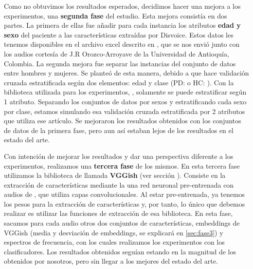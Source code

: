 Como no obtuvimos los resultados esperados, decidimos hacer una mejora a los experimentos, una \textbf{segunda fase} del estudio. Esta mejora consistía en dos partes. La primera de ellas fue añadir para cada instancia los atributos \textbf{edad y sexo} del paciente a las características extraídas por Disvoice. Estos datos les tenemos disponibles en el archivo excel descrito en \cite{OrzCorpus}, que se nos envió junto con los audios cortesía de J.R Orozco-Arroyave de la Universidad de Antioquía, Colombia. La segunda mejora fue separar las instancias del conjunto de datos entre hombres y mujeres. Se planteó de esta manera, debido a que \cite{Orz2016} hace validación cruzada estratificada según dos elementos: edad y clase (PD:  o HC: ). Con la biblioteca utilizada para los experimentos, , solamente se puede estratificar según 1 atributo. Separando los conjuntos de datos por sexos y estratificando cada sexo por clase, estamos simulando esa validación cruzada estratificada por 2 atributos que utiliza ese artículo. Se mejoraron los resultados obtenidos con los conjuntos de datos de la primera fase, pero aun así estaban lejos de los resultados en el estado del arte.

Con intención de mejorar los resultados y dar una perspectiva diferente a los experimentos, realizamos una \textbf{tercera fase} de los mismos. En esta tercera fase utilizamos la biblioteca de  llamada \textbf{VGGish} \cite{vggish} (ver sección \label{subsec:vggish}). Consiste en la extracción de características mediante la una red neuronal pre-entrenada con audios de ,  que utiliza capas convolucionales. Al estar pre-entrenada, ya tenemos los pesos para la extracción de características y, por tanto, lo único que debemos realizar es utilizar las funciones de extracción de esa biblioteca. En esta fase, sacamos para cada audio otros dos conjuntos de características, embeddings de VGGish (media y desviación de embeddings, se explicará en \ref{sec:fase3}) y espectros de frecuencia, con los cuales realizamos los experimentos con los clasificadores. Los resultados obtenidos seguían estando en la magnitud de los obtenidos por nosotros, pero sin llegar a los mejores del estado del arte.

